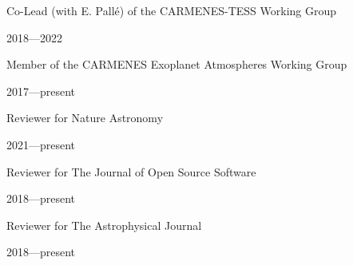 \documentclass[12pt, a4paper]{article} %
\begin{document}
\vspace{0.2cm}

\begin{minipage}[t]{0.7\textwidth}
\begin{flushleft}%
  \setlength{\leftskip}{0.2cm}%
Co-Lead (with E. Pall\'e) of the CARMENES-TESS Working Group 
\end{flushleft}
\end{minipage}
\begin{minipage}[t]{0.3\textwidth}
\hfill 2018---2022
\end{minipage}

\vspace{0.2cm}

\begin{minipage}[t]{0.7\textwidth}
\begin{flushleft}%
  \setlength{\leftskip}{0.2cm}%
Member of the CARMENES Exoplanet Atmospheres Working Group 
\end{flushleft}
\end{minipage}
\begin{minipage}[t]{0.3\textwidth}
\hfill 2017---present
\end{minipage}

\vspace{0.2cm}

\begin{minipage}[t]{0.7\textwidth}
\begin{flushleft}%
  \setlength{\leftskip}{0.2cm}%
Reviewer for Nature Astronomy
\end{flushleft}
\end{minipage}
\begin{minipage}[t]{0.3\textwidth}
\hfill 2021---present
\end{minipage}

\vspace{0.2cm}

\begin{minipage}[t]{0.7\textwidth}
\begin{flushleft}%
  \setlength{\leftskip}{0.2cm}%
Reviewer for The Journal of Open Source Software
\end{flushleft}
\end{minipage}
\begin{minipage}[t]{0.3\textwidth}
\hfill 2018---present
\end{minipage}

\vspace{0.2cm}

\begin{minipage}[t]{0.7\textwidth}
\begin{flushleft}%
  \setlength{\leftskip}{0.2cm}%
Reviewer for The Astrophysical Journal
\end{flushleft}
\end{minipage}
\begin{minipage}[t]{0.3\textwidth}
\hfill 2018---present
\end{minipage}
\end{document}

